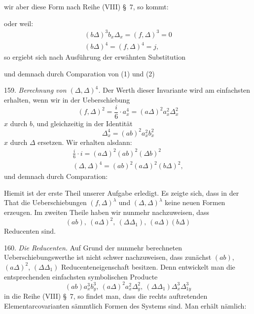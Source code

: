 
wir aber diese Form nach Reihe (VIII) \S~7, so kommt:


oder weil:
\[
\begin{gathered}
(b\Delta)^3 b_x \Delta_x = (f,\Delta)^3 = 0 \\
(b\Delta)^4 = (f,\Delta)^4 = j,
\end{gathered}
\]
so ergiebt sich nach Ausführung der erwähnten Substitution


und demnach durch Comparation von (1) und (2)


159. \textit{Berechnung von $(\Delta,\Delta)^4$.} Der Werth dieser Invariante wird am einfachsten erhalten, wenn wir in der Ueberschiebung
\[
(f,\Delta)^2 = \frac{i}{6}\cdot a_x^4 = (a\Delta)^2 a_x^2 \Delta_x^2
\]
$x$ durch $b$, und gleichzeitig in der Identität
\[
\Delta_x^4 = (ab)^2 a_x^2 b_x^2
\]
$x$ durch $\Delta$ ersetzen. Wir erhalten alsdann:
\[
\begin{gathered}
\frac{i}{6}\cdot i = (a\Delta)^2(ab)^2(\Delta b)^2 \\
(\Delta,\Delta)^4 = (ab)^2(a\Delta)^2(b\Delta)^2,
\end{gathered}
\]
und demnach durch Comparation:


Hiemit ist der erste Theil unserer Aufgabe erledigt. Es zeigte sich, dass in der That die Ueberschiebungen $(f,\Delta)^\lambda$ und $(\Delta,\Delta)^\lambda$ keine neuen Formen erzeugen. Im zweiten Theile haben wir nunmehr nachzuweisen, dass
\[
(ab),\ (a\Delta)^2,\ (\Delta\Delta_1),\ (a\Delta)(b\Delta)
\]
Reducenten sind.

160. \textit{Die Reducenten.} Auf Grund der nunmehr berechneten Ueberschiebungswerthe ist nicht schwer nachzuweisen, dass zunächst $(ab)$, $(a\Delta)^2$, $(\Delta\Delta_1)$ Reducenteneigenschaft besitzen. Denn entwickelt man die entsprechenden einfachsten symbolischen Producte
\[
(ab)a_x^3 b_y^3,\ (a\Delta)^2 a_x^2 \Delta_y^2,\ (\Delta\Delta_1)\Delta_x^3\Delta_{1y}^3
\]
in die Reihe (VIII) \S~7, so findet man, dass die rechts auftretenden Elementarcovarianten sämmtlich Formen des Systems sind. Man erhält nämlich:


